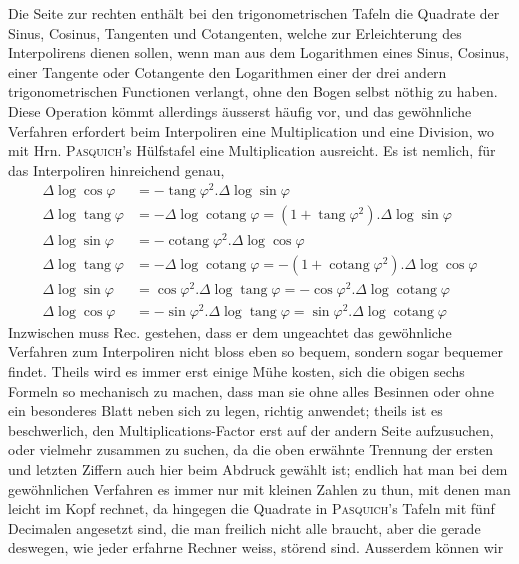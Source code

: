 Die Seite zur rechten enthält bei den trigonometrischen Tafeln die Quadrate
der Sinus, Cosinus, Tangenten und Cotangenten, welche zur Erleichterung des
Interpolirens dienen sollen, wenn man aus dem Logarithmen eines Sinus, Cosinus, einer Tangente oder Cotangente den Logarithmen einer der drei andern trigonometrischen Functionen verlangt, ohne den Bogen selbst nöthig zu haben.
Diese Operation kömmt allerdings äusserst häufig vor, und das gewöhnliche Verfahren erfordert beim Interpoliren eine Multiplication und eine Division, wo mit
Hrn. \textsc{Pasquich}'s Hülfstafel eine Multiplication ausreicht. Es ist nemlich, für das
Interpoliren hinreichend genau,
\[
\begin{aligned}
\Delta\log\cos\varphi&=-\operatorname{tang}\varphi^{2}.\Delta\log\sin\varphi\\
\Delta\log\operatorname{tang}\varphi&=-\Delta\log\operatorname{cotang}\varphi=(1+\operatorname{tang}\varphi^{2}).\Delta\log\sin\varphi\\
\Delta\log\sin\varphi&=-\operatorname{cotang}\varphi^{2}.\Delta\log\cos\varphi\\
\Delta\log\operatorname{tang}\varphi&=-\Delta\log\operatorname{cotang}\varphi=-(1+\operatorname{cotang}\varphi^{2}).\Delta\log\cos\varphi\\
\Delta\log\sin\varphi&=\cos\varphi^{2}.\Delta\log\operatorname{tang}\varphi=-\cos\varphi^{2}.\Delta\log\operatorname{cotang}\varphi\\
\Delta\log\cos\varphi&=-\sin\varphi^{2}.\Delta\log\operatorname{tang}\varphi=\sin\varphi^{2}.\Delta\log\operatorname{cotang}\varphi
\end{aligned}
\]
Inzwischen muss Rec. gestehen, dass er dem ungeachtet das gewöhnliche Verfahren zum Interpoliren nicht bloss eben so bequem, sondern sogar bequemer findet. Theils wird es immer erst einige Mühe kosten, sich die obigen sechs Formeln so mechanisch zu machen, dass man sie ohne alles Besinnen oder ohne ein
besonderes Blatt neben sich zu legen, richtig anwendet; theils ist es beschwerlich, den Multiplications-Factor erst auf der andern Seite aufzusuchen, oder vielmehr zusammen zu suchen, da die oben erwähnte Trennung der ersten und letzten Ziffern auch hier beim Abdruck gewählt ist; endlich hat man bei dem gewöhnlichen Verfahren es immer nur mit kleinen Zahlen zu thun, mit denen man
leicht im Kopf rechnet, da hingegen die Quadrate in \textsc{Pasquich}'s Tafeln mit fünf
Decimalen angesetzt sind, die man freilich nicht alle braucht, aber die gerade deswegen, wie jeder erfahrne Rechner weiss, störend sind. Ausserdem können wir
